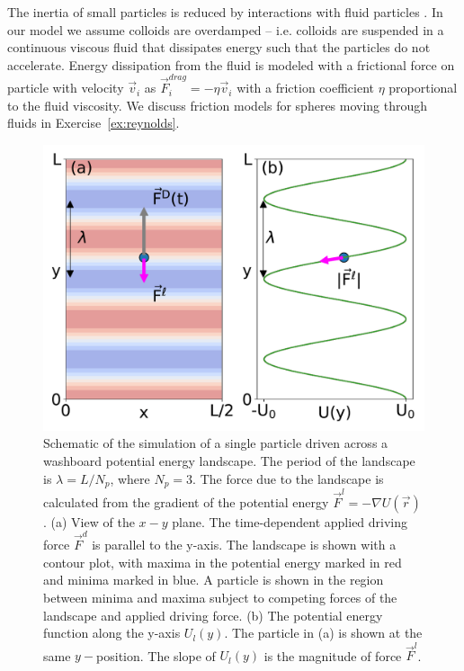 \documentclass[twocolumn,preprintnumbers,amsmath,amssymb,aps,prx]{revtex4}
\begin{document}
The inertia of 
small particles is reduced by interactions
with fluid particles \cite{Purcell1977}.
In our model
we assume 
colloids are overdamped
-- i.e. colloids are suspended in a continuous viscous fluid
that dissipates energy %
such 
that the particles do not accelerate.
Energy dissipation from the fluid is modeled
with a frictional force on particle with velocity $\vec{v}_i$ as
$\vec{F}^{drag}_i = -\eta \vec{v}_i$
with a friction coefficient $\eta$
proportional to the fluid viscosity.
We discuss friction models for
spheres moving through fluids in 
Exercise~\ref{ex:reynolds}. %
\begin{center}
\begin{figure}[h!]
\centering
\includegraphics[width=\columnwidth]{landscape.pdf}
\caption{
  Schematic of the simulation
  of a single particle
  driven across a washboard potential
  energy landscape.
  The period of the landscape is $\lambda = L/N_p$,  
  where $N_p = 3$.  
  The force due to the landscape %
  is calculated from the gradient of the potential
  energy 
  $\vec{F}^l = -\nabla U(\vec{r})$.
  (a) View of the $x-y$ plane. %
  The time-dependent applied driving force $\vec{F}^d$
  is parallel to the y-axis.
  The landscape is shown with a contour plot,
  with maxima in the potential energy marked in red
  and minima marked in blue.
  A particle is shown in the region between minima and maxima
  subject to competing forces of the landscape and applied driving force.
  (b) The potential energy function
  along the y-axis $U_l(y)$.  
  The particle in (a) is shown at the same $y-$position.
  The slope of $U_l(y)$ is the 
  magnitude of force $\vec{F}^l$. %
  }
\label{fig:landscape0}
\end{figure}
\end{center}
\end{document}
